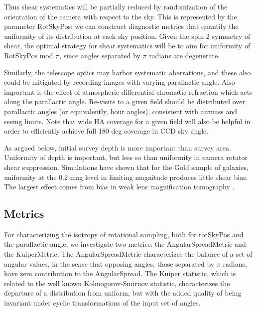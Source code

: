 Thus shear systematics will be partially reduced by randomization of the
orientation of the camera with respect to the sky.  This is represented by the
parameter RotSkyPos: we can construct diagnostic metrics that quantify the
uniformity of its distribution at each sky position.   Given the spin 2 symmetry
of shear, the optimal strategy for shear systematics will be to aim for
uniformity of RotSkyPos mod $\pi$, since angles separated by $\pi$ radians are
degenerate.

Similarly, the telescope optics may harbor systematic aberrations, and these
also could be mitigated by recording images with varying parallactic angle.
Also important is the effect of atmospheric differential chromatic refraction
which acts along the parallactic angle.  Re-visits to a given field should be
distributed over parallactic angles (or equivalently, hour angles), consistent
with airmass and seeing limits.  Note that wide HA coverage for a given field
will also  be helpful in order to efficiently achieve full 180 deg coverage in
CCD sky angle.

As argued below, initial survey depth is more important than survey area.
Uniformity of depth is important, but less so than uniformity in camera rotator
shear suppression.  Simulations have shown that for the Gold sample of galaxies,
uniformity at the 0.2 mag level in limiting magnitude produces little shear
bias. The largest effect comes from bias in weak lens magnification tomography
\citet{Morrison2012}.


\subsection{Metrics}

For characterizing the isotropy of rotational sampling, both for rotSkyPos and
the parallactic angle, we investigate two metrics: the AngularSpreadMetric and
the KuiperMetric.  The AngularSpreadMetric characterizes the balance of a set of
angular values, in the sense that opposing angles, those separated by $\pi$
radians, have zero contribution to the AngularSpread.  The Kuiper statistic,
which is related to the well known Kolmogorov-Smirnov statistic, characterizes
the departure of a distribution from uniform, but with the added quality of
being invariant under cyclic transformations of the input set of angles.

